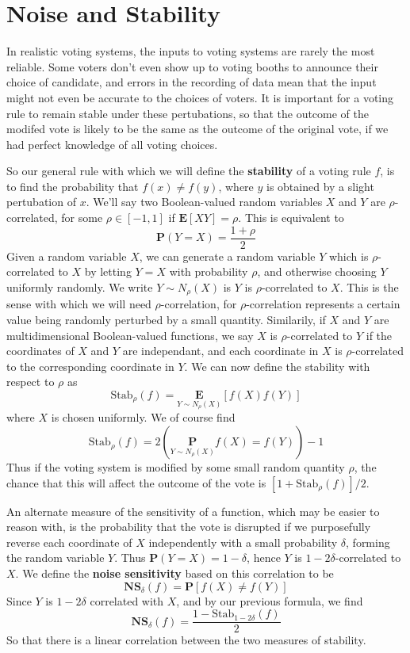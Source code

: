 \section{Noise and Stability}

In realistic voting systems, the inputs to voting systems are rarely the most reliable. Some voters don't even show up to voting booths to announce their choice of candidate, and errors in the recording of data mean that the input might not even be accurate to the choices of voters. It is important for a voting rule to remain stable under these pertubations, so that the outcome of the modifed vote is likely to be the same as the outcome of the original vote, if we had perfect knowledge of all voting choices.

So our general rule with which we will define the {\bf stability} of a voting rule $f$, is to find the probability that $f(x) \neq f(y)$, where $y$ is obtained by a slight pertubation of $x$. We'll say two Boolean-valued random variables $X$ and $Y$ are $\rho$-correlated, for some $\rho \in [-1,1]$ if $\mathbf{E}[XY] = \rho$. This is equivalent to
%
\[ \mathbf{P}(Y = X) = \frac{1 + \rho}{2} \]
%
Given a random variable $X$, we can generate a random variable $Y$ which is $\rho$-correlated to $X$ by letting $Y = X$ with probability $\rho$, and otherwise choosing $Y$ uniformly randomly. We write $Y \sim N_\rho(X)$ is $Y$ is $\rho$-correlated to $X$. This is the sense with which we will need $\rho$-correlation, for $\rho$-correlation represents a certain value being randomly perturbed by a small quantity. Similarily, if $X$ and $Y$ are multidimensional Boolean-valued functions, we say $X$ is $\rho$-correlated to $Y$ if the coordinates of $X$ and $Y$ are independant, and each coordinate in $X$ is $\rho$-correlated to the corresponding coordinate in $Y$. We can now define the stability with respect to $\rho$ as
%
\[ \text{Stab}_\rho(f) = \underset{Y \sim N_\rho(X)}{\mathbf{E}}[f(X)f(Y)] \]
%
where $X$ is chosen uniformly. We of course find
%
\[\text{Stab}_\rho(f) = 2 \left( \underset{Y \sim N_\rho(X)}{\mathbf{P}} f(X) = f(Y)  \right) - 1 \]
%
Thus if the voting system is modified by some small random quantity $\rho$, the chance that this will affect the outcome of the vote is $[1 + \text{Stab}_\rho(f)]/2$.

An alternate measure of the sensitivity of a function, which may be easier to reason with, is the probability that the vote is disrupted if we purposefully reverse each coordinate of $X$ independently with a small probability $\delta$, forming the random variable $Y$. Thus $\mathbf{P}(Y = X) = 1 - \delta$, hence $Y$ is $1 - 2\delta$-correlated to $X$. We define the {\bf noise sensitivity} based on this correlation to be
%
\[ \mathbf{NS}_\delta(f) = \mathbf{P}[ f(X) \neq f(Y) ]\]
%
Since $Y$ is $1 - 2\delta$ correlated with $X$, and by our previous formula, we find
%
\[ \mathbf{NS}_\delta(f) = \frac{1 - \text{Stab}_{1 - 2\delta}(f)}{2} \]
%
So that there is a linear correlation between the two measures of stability.

